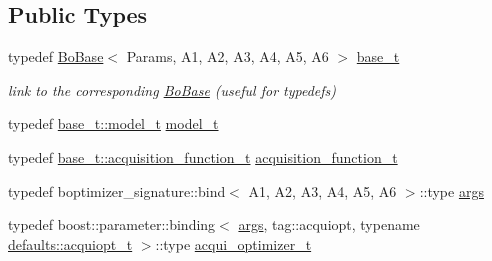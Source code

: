 \subsection*{Public Types}
\begin{DoxyCompactItemize}
\item 
typedef \hyperlink{classlimbo_1_1bayes__opt_1_1_bo_base}{Bo\+Base}$<$ Params, A1, A2, A3, A4, A5, A6 $>$ \hyperlink{classlimbo_1_1bayes__opt_1_1_b_optimizer_acfc58fcdd57f2f5520e6ba175677c319}{base\+\_\+t}
\begin{DoxyCompactList}\small\item\em link to the corresponding \hyperlink{classlimbo_1_1bayes__opt_1_1_bo_base}{Bo\+Base} (useful for typedefs) \end{DoxyCompactList}\item 
typedef \hyperlink{classlimbo_1_1bayes__opt_1_1_bo_base_a151af5c7eef92a82d8813bb2e067d267}{base\+\_\+t\+::model\+\_\+t} \hyperlink{classlimbo_1_1bayes__opt_1_1_b_optimizer_aaddb85f5014ba377c9e2e3a64db87678}{model\+\_\+t}
\item 
typedef \hyperlink{classlimbo_1_1bayes__opt_1_1_bo_base_a200a43abb6c95d2d99660898b36f2200}{base\+\_\+t\+::acquisition\+\_\+function\+\_\+t} \hyperlink{classlimbo_1_1bayes__opt_1_1_b_optimizer_ae0a407a5eba370a6a30acda501cd4ddc}{acquisition\+\_\+function\+\_\+t}
\item 
typedef boptimizer\+\_\+signature\+::bind$<$ A1, A2, A3, A4, A5, A6 $>$\+::type \hyperlink{classlimbo_1_1bayes__opt_1_1_b_optimizer_afd4c6a7d361de59fac5aa3a332ea0149}{args}
\item 
typedef boost\+::parameter\+::binding$<$ \hyperlink{classlimbo_1_1bayes__opt_1_1_bo_base_a3844c259aa1e59d0241f90390aa6f7fa}{args}, tag\+::acquiopt, typename \hyperlink{structlimbo_1_1bayes__opt_1_1_b_optimizer_1_1defaults_a4eb44d2abad01f5ef0206b7c5c595c7b}{defaults\+::acquiopt\+\_\+t} $>$\+::type \hyperlink{classlimbo_1_1bayes__opt_1_1_b_optimizer_a18dc1b593c859b8f89450a31f80fb592}{acqui\+\_\+optimizer\+\_\+t}
\end{DoxyCompactItemize}
